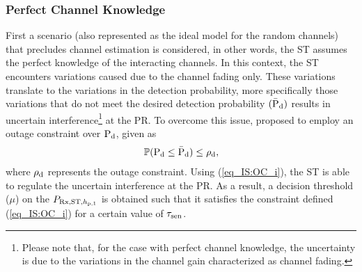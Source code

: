 \subsubsection{Perfect Channel Knowledge}
First a scenario (also represented as the ideal model for the random channels) that precludes channel estimation is considered, in other words, the ST assumes the perfect knowledge of the interacting channels. In this context, the ST encounters variations caused due to the channel fading only. These variations translate to the variations in the detection probability, more specifically those variations that do not meet the desired detection probability $(\bar{\text{P}}_{\text{d}})$ results in uncertain interference\footnote{Please note that, for the case with perfect channel knowledge, the uncertainty is due to the variations in the channel gain characterized as channel fading.} at the PR. To overcome this issue, \cite{Juarez11} proposed to employ an outage constraint over $\text{P}_{\text{d}}$, given as
\begin{align}
\mathbb P( \text{P}_{\text{d}} \le \bar{\text{P}}_{\text{d}}) \le \rho_{\text{d}}, \label{eq_IS:OC_i}
\end{align}
where $\rho_{\text{d}}$ represents the outage constraint. Using (\ref{eq_IS:OC_i}), the ST is able to regulate the uncertain interference at the PR. As a result, a decision threshold ($\mu$) on the $P_{\text{Rx,ST,$h_{\text{p,1}}$}}$ is obtained such that it satisfies the constraint defined (\ref{eq_IS:OC_i}) for a certain value of $\tau_{\text{sen}}$.

